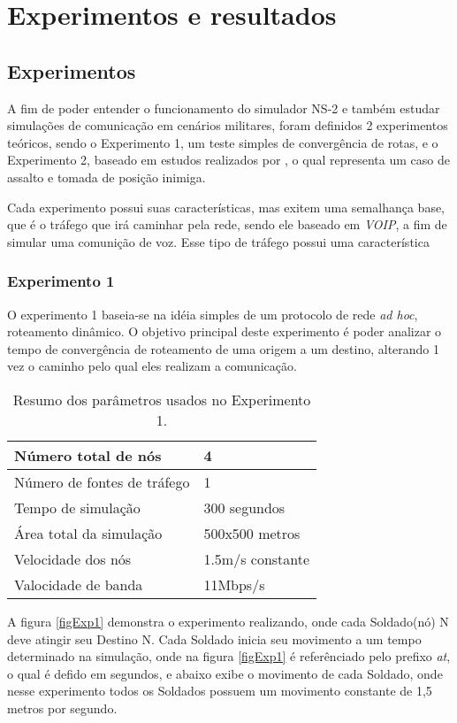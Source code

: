 \section{Experimentos e resultados}
\subsection{Experimentos}
A fim de poder entender o funcionamento do simulador NS-2 e tamb\'em estudar simula\c{c}\~oes de comunica\c{c}\~ao em cen\'arios militares, foram definidos 2 experimentos te\'oricos, sendo o Experimento 1, um teste simples de converg\^encia de rotas, e o Experimento 2, baseado em estudos realizados por \cite{pereira}, o qual representa um caso de assalto e tomada de posi\c{c}\~ao inimiga.

Cada experimento possui suas caracter\'isticas, mas exitem uma semalhan\c{c}a base, que \'e o tr\'afego que ir\'a caminhar pela rede, sendo ele baseado em \textit{VOIP}, a fim de simular uma comuni\c{c}\~ao de voz.
Esse tipo de tr\'afego possui uma caracter\'istica

\subsubsection{Experimento 1}\label{SecExp1}
O experimento 1 baseia-se na id\'eia simples de um protocolo de rede \textit{ad hoc}, roteamento din\^amico.
O objetivo principal deste experimento \'e poder analizar o tempo de converg\^encia de roteamento de uma origem a um destino, alterando 1 vez o caminho pelo qual eles realizam a comunica\c{c}\~ao.

\begin{table}[H]
	\centering
	\begin{tabular}{ | l | l | }
		\hline
		N\'umero total de n\'os & 4 \\ \hline
		N\'umero de fontes de tr\'afego & 1 \\ \hline
		Tempo de simula\c{c}\~ao & 300 segundos \\ \hline
		\'Area total da simula\c{c}\~ao & 500x500 metros \\ \hline
		Velocidade dos n\'os & 1.5m/s constante \\ \hline
		Valocidade de banda & 11Mbps/s \\ \hline
	\end{tabular}
	\caption{Resumo dos par\^ametros usados no Experimento 1.}
	\label{tabParamExp1}
\end{table}

A figura \ref{figExp1} demonstra o experimento realizando, onde cada Soldado(n\'o) N deve atingir seu Destino N.
Cada Soldado inicia seu movimento a um tempo determinado na simula\c{c}\~ao, onde na figura \ref{figExp1} \'e refer\^enciado pelo prefixo \textit{at}, o qual \'e defido em segundos, e abaixo exibe o movimento de cada Soldado, onde nesse experimento todos os Soldados possuem um movimento constante de 1,5 metros por segundo. 

